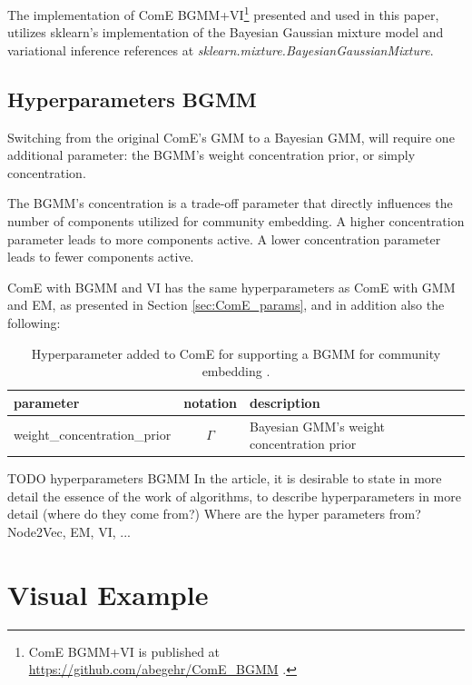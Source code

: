 \documentclass[conference]{IEEEtran}
\begin{document}
The implementation of ComE BGMM+VI\footnote{ComE BGMM+VI is published at \url{https://github.com/abegehr/ComE_BGMM} \cite{ComE_BGMM_GH}.} presented and used in this paper, utilizes sklearn's implementation of the Bayesian Gaussian mixture model and variational inference references at \textit{sklearn.mixture.BayesianGaussianMixture}.\cite{scikit-learn, sklearn_api}

\subsection{Hyperparameters BGMM}
\label{ComE_BGMM_params}

Switching from the original ComE's GMM to a Bayesian GMM, will require one additional parameter: the BGMM's weight concentration prior, or simply concentration.

The BGMM's concentration is a trade-off parameter that directly influences the number of components utilized for community embedding. A higher concentration parameter leads to more components active. A lower concentration parameter leads to fewer components active.

ComE with BGMM and VI has the same hyperparameters as ComE with GMM and EM, as presented in Section \ref{sec:ComE_params}, and in addition also the following:

\begin{table}[H]
    \centering
    \caption{Hyperparameter added to ComE for supporting a BGMM for community embedding \cite{ComE_BGMM_GH}.}
    \label{table:params_ComE_BGMM}
    \begin{tabularx}{\linewidth}{ l | c | X }
        parameter                    & notation & description                               \\
        \hline
        \hline
        weight\_concentration\_prior & $\Gamma$ & Bayesian GMM's weight concentration prior \\
    \end{tabularx}
\end{table}

TODO hyperparameters BGMM
In the article, it is desirable to state in more detail the essence of the work of algorithms, to describe hyperparameters in more detail (where do they come from?)
Where are the hyper parameters from? Node2Vec, EM, VI, ...

\section{Visual Example}
\label{ch:come_visual}
\end{document}
